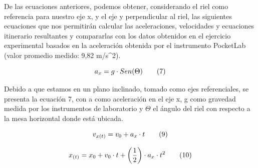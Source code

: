 \documentclass[twocolumn,12pt]{article}
\begin{document}
	\vspace{1cm}
	\begin{justify}
	De las ecuaciones anteriores, podemos obtener, considerando el riel como referencia para nuestro eje x, y el eje y perpendicular al riel, las siguientes ecuaciones que nos permitirán calcular las aceleraciones, velocidades y ecuaciones itinerario resultantes y compararlas con los datos obtenidos en el ejercicio experimental basados en la aceleración obtenida por el instrumento PocketLab (valor promedio medido: 9,82 m/s^{2}).
    \end{justify}
	\vspace{-1cm}
	\begin{center}
	\begin{equation}
	\centering
	a_{x} = g \cdot Sen (\Theta) \tag*{(7)} 
	\end{equation}
	
	\vspace{-0.4cm}  
	
	\centering{}
	\end{center}
	
	Debido a que estamos en un plano inclinado, tomado como ejes referenciales, se presenta la ecuación 7, con a como aceleración en el eje x, g como gravedad medida por los instrumentos de laboratorio y $\Theta$ el ángulo del riel con respecto a la mesa horizontal donde está ubicada.
	\vspace{-0.5cm}
	\begin{center}
	\begin{equation}
	\centering
	v_{x(t)} = v_{0} + a_{x}\cdot t \tag*{(9)} 
	\end{equation}
	
	\vspace{-0.4cm}  
	
	\centering{}
	
		\begin{equation}
	\centering
	x_{(t)} = x_{0} + v_{0} \cdot t + \left( \frac{1}{2} \right) \cdot a_{x}\cdot t^{2} \tag*{(10)} 
	\end{equation}
	
	\vspace{-0.4cm}  
	
	\centering{}
	\end{center}
\end{document}

